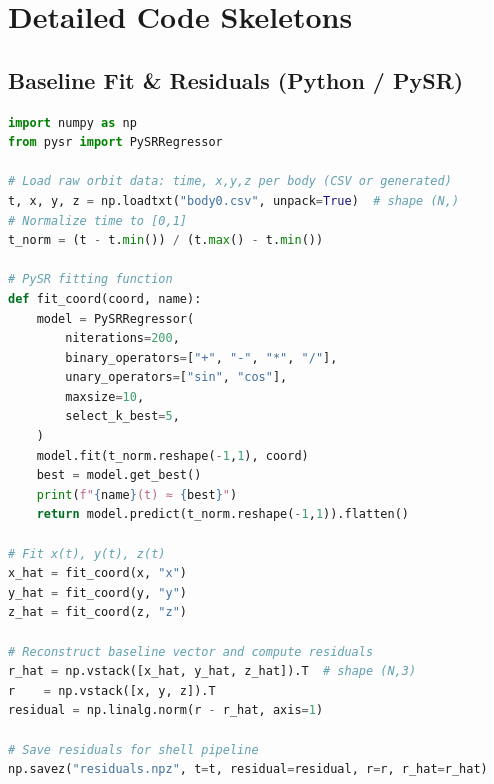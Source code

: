 \documentclass[11pt]{article}
\begin{document}
\section{Detailed Code Skeletons}\label{app:codes}

\subsection{Baseline Fit \& Residuals (Python / PySR)}
\begin{lstlisting}[language=Python,caption={baseline\_fit.py — Fit and extract residuals with PySR},label={code:baseline_fit}]
import numpy as np
from pysr import PySRRegressor

# Load raw orbit data: time, x,y,z per body (CSV or generated)
t, x, y, z = np.loadtxt("body0.csv", unpack=True)  # shape (N,)
# Normalize time to [0,1]
t_norm = (t - t.min()) / (t.max() - t.min())

# PySR fitting function
def fit_coord(coord, name):
    model = PySRRegressor(
        niterations=200,
        binary_operators=["+", "-", "*", "/"],
        unary_operators=["sin", "cos"],
        maxsize=10,
        select_k_best=5,
    )
    model.fit(t_norm.reshape(-1,1), coord)
    best = model.get_best()
    print(f"{name}(t) ≈ {best}")
    return model.predict(t_norm.reshape(-1,1)).flatten()

# Fit x(t), y(t), z(t)
x_hat = fit_coord(x, "x")
y_hat = fit_coord(y, "y")
z_hat = fit_coord(z, "z")

# Reconstruct baseline vector and compute residuals
r_hat = np.vstack([x_hat, y_hat, z_hat]).T  # shape (N,3)
r    = np.vstack([x, y, z]).T
residual = np.linalg.norm(r - r_hat, axis=1)

# Save residuals for shell pipeline
np.savez("residuals.npz", t=t, residual=residual, r=r, r_hat=r_hat)
\end{lstlisting}
\end{document}
